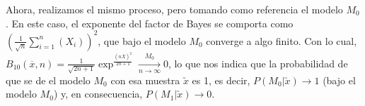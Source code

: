 \begin{ex}
	Ahora, realizamos el mismo proceso, pero tomando como referencia el modelo $M_0$. En este caso, el exponente del factor de Bayes se comporta como $(\frac{1}{\sqrt{n}} \sum_{i=1}^{n}(X_i))^2$, que bajo el modelo $M_0$ converge a algo finito. Con lo cual,
	$B_{10}(\overline{x},n) = \frac{1}{\sqrt{2n+1}}  \exp^\frac{(n  \overline{X})^2}{2n+1} \xrightarrow[n\to\infty]{M_0} 0$, lo que nos indica que la probabilidad de que se de el modelo $M_0$ con esa muestra $\utilde{x}$ es 1, es decir, $P(M_0 | \utilde{x}) \longrightarrow 1$ (bajo el modelo $M_0$) y, en consecuencia, $P(M_1 | \utilde{x}) \longrightarrow 0$.
\end{ex}
